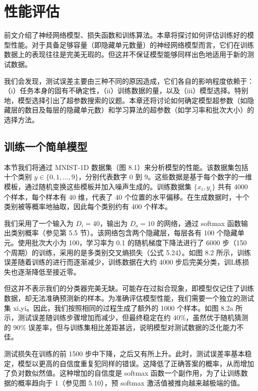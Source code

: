 \chapter{性能评估}

前文介绍了神经网络模型、损失函数和训练算法。本章将探讨如何评估训练好的模型性能。对于具备足够容量（即隐藏单元数量）的神经网络模型而言，它们在训练数据上的表现往往是完美无瑕的。但这并不保证模型能够同样出色地适用于新的测试数据。

我们会发现，测试误差主要由三种不同的原因造成，它们各自的影响程度依赖于：（i）任务本身的固有不确定性，（ii）训练数据的量，以及（iii）模型选择。特别地，模型选择引出了超参数搜索的议题。本章还将讨论如何确定模型超参数（如隐藏层的数目及每层的隐藏单元数）和学习算法的超参数（如学习率和批次大小）的选择方法。
\section{训练一个简单模型}
本节我们将通过 MNIST-1D 数据集（图 8.1）来分析模型的性能。该数据集包括十个类别 \(y \in \{0,1,\ldots,9\}\)，分别代表数字 0 到 9。这些数据是基于每个数字的一维模板，通过随机变换这些模板并加入噪声生成的。训练数据集 \(\{x_i, y_i\}\) 共有 4000 个样本，每个样本有 40 维，代表了 40 个位置的水平偏移。在生成数据时，十个类别被等概率地抽取，因此每个类别约有 400 个样本。

我们采用了一个输入为 \(D_i = 40\)，输出为 \(D_o = 10\) 的网络，通过 softmax 函数输出类别概率（参见第 5.5 节）。该网络包含两个隐藏层，每层各有 100 个隐藏单元。使用批次大小为 100，学习率为 0.1 的随机梯度下降法进行了 6000 步（150 个周期）的训练，采用的是多类别交叉熵损失（公式 5.24）。如图 8.2 所示，训练误差随着训练的进行而逐渐减少，训练数据在大约 4000 步后完美分类，训L练损失也逐渐降低至接近零。

但这并不表示我们的分类器完美无缺。可能存在过拟合现象，即模型仅记住了训练数据，却无法准确预测新的样本。为准确评估模型性能，我们需要一个独立的测试集 {xi,yi}。因此，我们按照相同的过程生成了额外的 1000 个样本。如图 8.2a 所示，测试误差随训练步骤增加而减少，但最终稳定在约 40\%，虽然优于随机猜测的 90\% 误差率，但与训练集相比差距甚远，说明模型对测试数据的泛化能力不佳。

测试损失在训练的前 1500 步中下降，之后又有所上升。此时，测试误差率基本稳定，模型以更高的自信度重复犯同样的错误。这降低了正确答案的概率，从而增加了负对数似然值。这种增加的自信度是 softmax 函数一个副作用，为了让训练数据的概率趋向于 1（参见图 5.10），预 softmax 激活值被推向越来越极端的值。


